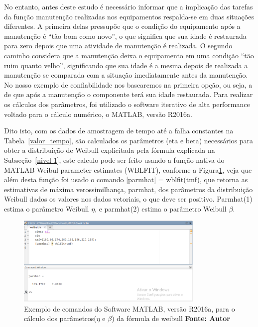 No entanto, antes deste estudo é necessário informar que a implicação das tarefas da função manutenção realizadas nos equipamentos respalda-se em duas situações diferentes. A primeira delas pressupõe que o condição do equipamento após a manutenção é “tão bom como novo”, o que significa que sua idade é restaurada para zero depois que uma atividade de manutenção é realizada. O segundo caminho considera que a manutenção deixa o equipamento em uma condição “tão ruim quanto velho”, significando que sua idade é a mesma depois de realizada a manutenção se comparada com a situação imediatamente antes da manutenção. No nosso exemplo de confiabilidade nos basearemos na primeira opção, ou seja, a de que após a manutenção o componente terá sua idade restaurada. Para realizar os cálculos dos parâmetros, foi utilizado o software iterativo de alta performance voltado para o cálculo numérico, o MATLAB, versão R2016a.

Dito isto, com os dados de amostragem de tempo até a falha constantes na Tabela~\ref{valor_tempo}, são calculados os parâmetros (eta e beta) necessários para obter a distribuição de Weibull explicitada pela fórmula explicada na Subseção~\ref{nivel 1}, este calculo pode ser feito usando a função nativa do MATLAB Weibul parameter estimates (WBLFIT), conforme a Figura\ref{parametros_weibull}, veja que além desta função foi usado o comando [parmhat] = wblfit(tmf), que retorna as estimativas de máxima verossimilhança, parmhat, dos parâmetros da distribuição Weibull dados os valores nos dados vetoriais, o que deve ser positivo. Parmhat(1) estima o parâmetro Weibull $ \eta $, e parmhat(2) estima o parâmetro Weibull $ \beta $. 

\graphicspath{{figuras/}}
\begin{figure}[H]
\centering
\includegraphics[width=0.8\textwidth]{parametros_weibull.eps}
\caption{Exemplo de comandos do Software MATLAB, versão R2016a, para o cálculo dos parâmetros($ \eta $ e $ \beta $) da fórmula de weibull \textbf{Fonte: Autor}}
\label{parametros_weibull}
\end{figure}

